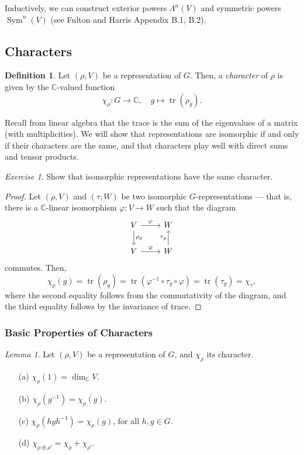 \documentclass[a4paper]{report}
\theoremstyle{definition}
\newtheorem{definition}{Definition}
\theoremstyle{remark}
\theoremstyle{proposition}
\theoremstyle{conjecture}
\theoremstyle{lemma}
\newtheorem{lemma}{Lemma}
\theoremstyle{corollary}
\theoremstyle{exercise}
\newtheorem{exercise}{Exercise}
\theoremstyle{example}
\newcommand{\C}{\mathbb{C}}
\newcommand{\on}{\operatorname}
\begin{document}
Inductively, we can construct exterior powers $\Lambda^n(V)$ and 
symmetric powers $\on{Sym}^n(V)$ (see Fulton and Harris Appendix B.1, B.2).

\subsection{Characters}

\begin{definition}
    Let $(\rho,V)$ be a representation of $G$. Then, a \emph{character} of 
    $\rho$ is given by the $\C$-valued function 
    $$\chi_\rho : G \longrightarrow \C,\quad g\longmapsto \on{tr}(\rho_g).$$
\end{definition}

Recall from linear algebra that the trace is the sum of the eigenvalues 
of a matrix (with multiplicities). We will show that representations 
are isomorphic if and only if their characters are the same,
and that characters play well with direct sums and tensor products.

\begin{exercise}
    Show that isomorphic representations have the same character. 
\end{exercise}

\begin{proof}
    Let $(\rho,V)$ and $(\tau,W)$ be two isomorphic $G$-representations ---
    that is, there is a $\C$-linear isomorphism $\varphi : V\to W$ such that the 
    diagram
    $$\begin{tikzcd}
V \arrow[r, "\varphi"] \arrow[d, "\rho_g"] & W                     \\
V \arrow[r, "\varphi"]                     & W \arrow[u, "\tau_g"]
\end{tikzcd}$$
    commutes. Then,
    $$\chi_\rho(g) = \on{tr}(\rho_g) = \on{tr}(\varphi^{-1} \circ \tau_g\circ \varphi) = \on{tr}(\tau_g) = \chi_\tau,$$
    where the second equality follows from the commutativity of the diagram, 
    and the third equality follows by the invariance of trace.
\end{proof}

\subsubsection{Basic Properties of Characters}

\begin{lemma}
    Let $(\rho,V)$ be a representation of $G$, and $\chi_\rho$ its character.
    \begin{itemize}
        \item[(a)] $\chi_\rho(1) = \dim_\C V.$
        \item[(b)] $\chi_\rho(g^{-1}) = \overline{\chi_\rho(g)}$.
        \item[(c)] $\chi_\rho(hgh^{-1}) = \chi_\rho(g)$, for all $h,g\in G$.
        \item[(d)] $\chi_{\rho\oplus \rho'} = \chi_\rho +\chi_{\rho'}$.
    \end{itemize}
\end{lemma}
\end{document}
